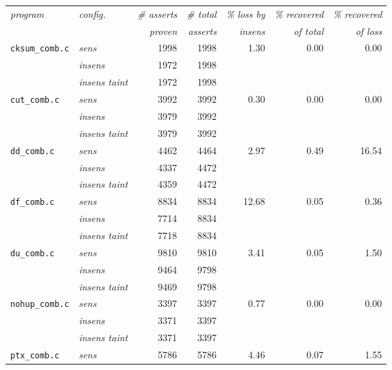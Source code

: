       \begin{table}
        \centering
        \begin{tabular}{l|l||r|r||r|r|r}
          \textit{program} & \textit{config.} & \textit{\# asserts} & \textit{\# total} & \textit{\% loss by} & \textit{\% recovered} & \textit{\% recovered}\\
            &  & \textit{proven} & \textit{asserts} & \textit{insens} & \textit{of total} & \textit{of loss}\\
          \hline
          \texttt{cksum\_comb.c} & \textit{sens} & 1998 & 1998 & 1.30 & 0.00 & 0.00\\
          & \textit{insens} & 1972 & 1998 & & & \\
          & \textit{insens taint} & 1972 & 1998 & & & \\
          \hline
          \texttt{cut\_comb.c} & \textit{sens} & 3992 & 3992 & 0.30 & 0.00 & 0.00\\
          & \textit{insens} & 3979 & 3992 & & & \\
          & \textit{insens taint} & 3979 & 3992 & & & \\
          \hline
          \texttt{dd\_comb.c} & \textit{sens} & 4462 & 4464 & 2.97 & 0.49 & 16.54\\
          & \textit{insens} & 4337 & 4472 & & & \\
          & \textit{insens taint} & 4359 & 4472 & & & \\
          \hline          
          \texttt{df\_comb.c} & \textit{sens} & 8834 & 8834 & 12.68 & 0.05 & 0.36\\
          & \textit{insens} & 7714 & 8834 & & & \\
          & \textit{insens taint} & 7718 & 8834 & & & \\
          \hline         
          \texttt{du\_comb.c} & \textit{sens} & 9810 & 9810 & 3.41 & 0.05 & 1.50\\
          & \textit{insens} & 9464 & 9798 & & & \\
          & \textit{insens taint} & 9469 & 9798 & & & \\
          \hline         
          \texttt{nohup\_comb.c} & \textit{sens} & 3397 & 3397 & 0.77 & 0.00 & 0.00\\
          & \textit{insens} & 3371 & 3397 & & & \\
          & \textit{insens taint} & 3371 & 3397 & & & \\
          \hline         
          \texttt{ptx\_comb.c} & \textit{sens} & 5786 & 5786 & 4.46 & 0.07 & 1.55\\

\end{tabular}
\end{table}
